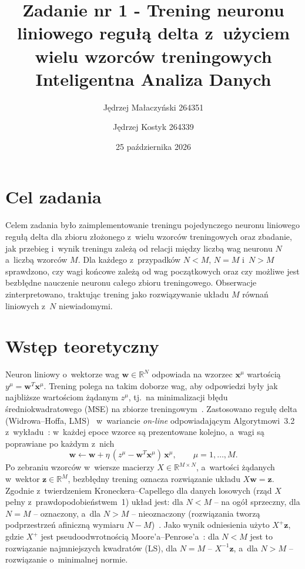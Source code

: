 \documentclass[12pt]{article}
\title{{\bf Zadanie nr 1 - Trening neuronu liniowego regułą delta z~użyciem wielu wzorców treningowych}\linebreak
Inteligentna Analiza Danych}
\author{Jędrzej Małaczyński 264351 \and Jędrzej Kostyk 264339}
\date{25 października 2026}
\begin{document}
\clearpage\maketitle
\thispagestyle{empty}
\newpage
\setcounter{page}{1}
\section{Cel zadania}

Celem zadania było zaimplementowanie treningu pojedynczego neuronu liniowego
regułą delta dla zbioru złożonego z~wielu wzorców treningowych oraz zbadanie,
jak przebieg i~wynik treningu zależą od relacji między liczbą wag neuronu $N$
a~liczbą wzorców $M$. Dla każdego z~przypadków $N<M$, $N=M$ i~$N>M$ sprawdzono,
czy wagi końcowe zależą od wag początkowych oraz czy możliwe jest bezbłędne
nauczenie neuronu całego zbioru treningowego. Obserwacje zinterpretowano,
traktując trening jako rozwiązywanie układu $M$ równań liniowych z~$N$ niewiadomymi.

\section{Wstęp teoretyczny}

Neuron liniowy o~wektorze wag $\mathbf{w}\in\mathbb{R}^N$ odpowiada na wzorzec
$\mathbf{x}^{\mu}$ wartością $y^{\mu}=\mathbf{w}^{T}\mathbf{x}^{\mu}$. Trening
polega na takim doborze wag, aby odpowiedzi były jak najbliższe wartościom
żądanym $z^{\mu}$, tj.~na minimalizacji błędu średniokwadratowego (MSE)
na zbiorze treningowym~\cite{wyklad1,haykin2009}.
Zastosowano regułę delta (Widrowa--Hoffa, LMS)~\cite{widrow1960} w~wariancie
\textit{on-line} odpowiadającym Algorytmowi~3.2 z~wykładu~\cite{wyklad1}:
w~każdej epoce wzorce są prezentowane kolejno, a~wagi są poprawiane po każdym z~nich
\begin{equation}
 \mathbf{w} \leftarrow \mathbf{w} + \eta\,(z^{\mu}-\mathbf{w}^{T}\mathbf{x}^{\mu})\,\mathbf{x}^{\mu},
 \qquad \mu = 1,\dots,M .
 \label{eq_delta}
\end{equation}
Po zebraniu wzorców w~wiersze macierzy $X\in\mathbb{R}^{M\times N}$, a~wartości
żądanych w~wektor $\mathbf{z}\in\mathbb{R}^{M}$, bezbłędny trening oznacza
rozwiązanie układu $X\mathbf{w}=\mathbf{z}$. Zgodnie z~twierdzeniem
Kroneckera--Capellego dla danych losowych (rząd $X$ pełny z~prawdopodobieństwem~1)
układ jest: dla $N<M$ -- na ogół sprzeczny, dla $N=M$ -- oznaczony, a~dla $N>M$
-- nieoznaczony (rozwiązania tworzą podprzestrzeń afiniczną wymiaru $N-M$)~\cite{osowski2000}.
Jako wynik odniesienia użyto $X^{+}\mathbf{z}$, gdzie $X^{+}$ jest pseudoodwrotnością
Moore'a--Penrose'a~\cite{penrose1955}: dla $N<M$ jest to rozwiązanie
najmniejszych kwadratów (LS), dla $N=M$ -- $X^{-1}\mathbf{z}$, a~dla $N>M$
-- rozwiązanie o~minimalnej normie.
\end{document}
